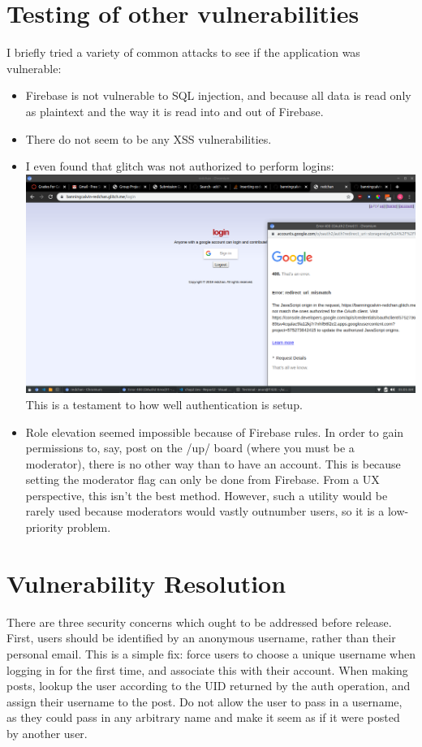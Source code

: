 \section{Testing of other vulnerabilities}
I briefly tried a variety of common attacks to see if the application was vulnerable:
\begin{itemize}
    \item Firebase is not vulnerable to SQL injection, and because all data is read only as plaintext and the way it is read into and out of Firebase.
    \item There do not seem to be any XSS vulnerabilities.
    \item I even found that glitch was not authorized to perform logins:\\
    \includegraphics[width = 400pt]{images/account.png}\\
    This is a testament to how well authentication is setup.
    \item Role elevation seemed impossible because of Firebase rules. In order to gain permissions to, say, post on the /up/ board (where you must be a moderator), there is no other way than to have an account. This is because setting the moderator flag can only be done from Firebase. From a UX perspective, this isn't the best method. However, such a utility would be rarely used because moderators would vastly outnumber users, so it is a low-priority problem.
\end{itemize}

\section{Vulnerability Resolution}

There are three security concerns which ought to be addressed before release. First, users should be identified by an anonymous username, rather than their personal email. This is a simple fix: force users to choose a unique username when logging in for the first time, and associate this with their account. When making posts, lookup the user according to the UID returned by the auth operation, and assign their username to the post. Do not allow the user to pass in a username, as they could pass in any arbitrary name and make it seem as if it were posted by another user.


